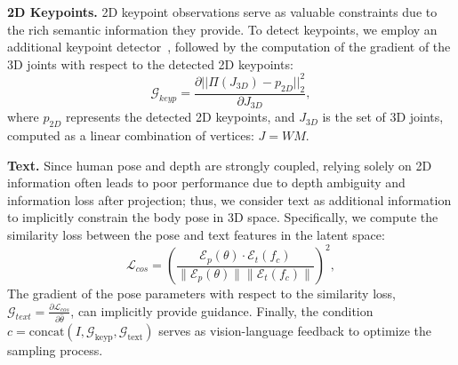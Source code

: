 {\textbf{2D Keypoints.} 2D keypoint observations serve as valuable constraints due to the rich semantic information they provide. To detect keypoints, we employ an additional keypoint detector~\cite{fang2022alphapose}, followed by the computation of the gradient of the 3D joints with respect to the detected 2D keypoints:
\begin{equation}\label{10}
\mathcal{G}_{keyp} = \frac{\partial||\Pi(J_{3D})- p_{2D}||_2^2}{\partial J_{3D}},
\end{equation}
where $p_{2D}$ represents the detected 2D keypoints, and $J_{3D}$ is the set of 3D joints, computed as a linear combination of vertices: $J=WM$.

\textbf{Text.} Since human pose and depth are strongly coupled, relying solely on 2D information often leads to poor performance due to depth ambiguity and information loss after projection; thus, we consider text as additional information to implicitly constrain the body pose in 3D space. Specifically, we compute the similarity loss between the pose and text features in the latent space:
\begin{equation}
\mathcal{L}_{cos}  =  \left(
\frac{\mathcal{E}_p(\theta)\cdot\mathcal{E}_t(f_{c})}{\|\mathcal{E}_p(\theta)\|\|\mathcal{E}_t(f_{c})\|} \right)^2,
\end{equation}
The gradient of the pose parameters with respect to the similarity loss, $\mathcal{G}_{text} = \frac{\partial \mathcal{L}_{cos}}{\partial \hat{\theta}}$, can implicitly provide guidance. Finally, the condition $c = \text{concat}(I,\mathcal{G}_{\text{keyp}}, \mathcal{G}_{\text{text}})$ serves as vision-language feedback to optimize the sampling process.}

\vspace{-2mm}
